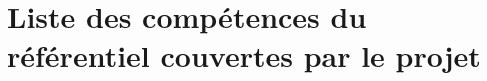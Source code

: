 \chapter{Liste des compétences du référentiel couvertes par le projet}\label{ch:liste-des-competences}